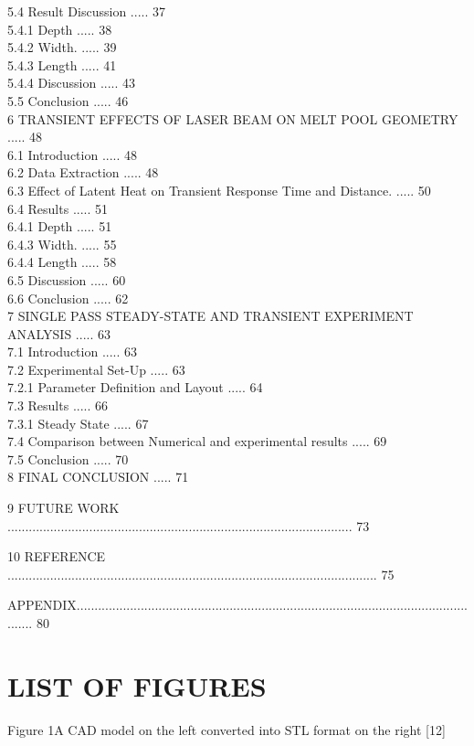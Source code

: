 \documentclass[10pt]{article}
\begin{document}
5.4 Result Discussion ..... 37\\
5.4.1 Depth ..... 38\\
5.4.2 Width. ..... 39\\
5.4.3 Length ..... 41\\
5.4.4 Discussion ..... 43\\
5.5 Conclusion ..... 46\\
6 TRANSIENT EFFECTS OF LASER BEAM ON MELT POOL GEOMETRY ..... 48\\
6.1 Introduction ..... 48\\
6.2 Data Extraction ..... 48\\
6.3 Effect of Latent Heat on Transient Response Time and Distance. ..... 50\\
6.4 Results ..... 51\\
6.4.1 Depth ..... 51\\
6.4.3 Width. ..... 55\\
6.4.4 Length ..... 58\\
6.5 Discussion ..... 60\\
6.6 Conclusion ..... 62\\
7 SINGLE PASS STEADY-STATE AND TRANSIENT EXPERIMENT ANALYSIS ..... 63\\
7.1 Introduction ..... 63\\
7.2 Experimental Set-Up ..... 63\\
7.2.1 Parameter Definition and Layout ..... 64\\
7.3 Results ..... 66\\
7.3.1 Steady State ..... 67\\
7.4 Comparison between Numerical and experimental results ..... 69\\
7.5 Conclusion ..... 70\\
8 FINAL CONCLUSION ..... 71

9 FUTURE WORK ................................................................................................. 73

10 REFERENCE ........................................................................................................ 75

APPENDIX..................................................................................................................... 80

\section*{LIST OF FIGURES}
Figure 1A CAD model on the left converted into STL format on the right [12]
\end{document}
